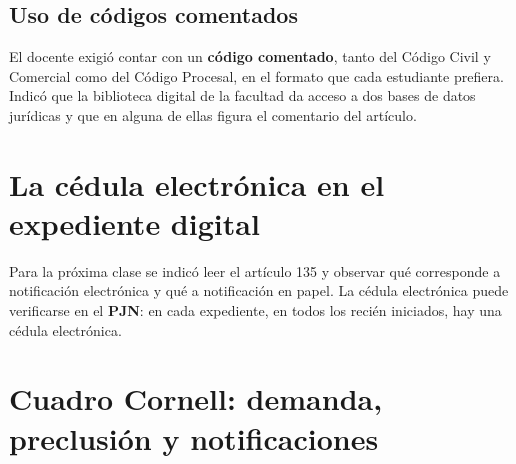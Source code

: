 \documentclass[12pt,oneside]{book}
\begin{document}

\subsection{Uso de códigos comentados}

\begin{important}
El docente exigió contar con un \textbf{código comentado}, tanto del Código Civil y Comercial como del Código Procesal, en el formato que cada estudiante prefiera. Indicó que la biblioteca digital de la facultad da acceso a dos bases de datos jurídicas y que en alguna de ellas figura el comentario del artículo.
\end{important}

\section{La cédula electrónica en el expediente digital}

Para la próxima clase se indicó leer el artículo 135 y observar qué corresponde a notificación electrónica y qué a notificación en papel. La cédula electrónica puede verificarse en el \textbf{PJN}: en cada expediente, en todos los recién iniciados, hay una cédula electrónica.

\section{Cuadro Cornell: demanda, preclusión y notificaciones}
\end{document}
